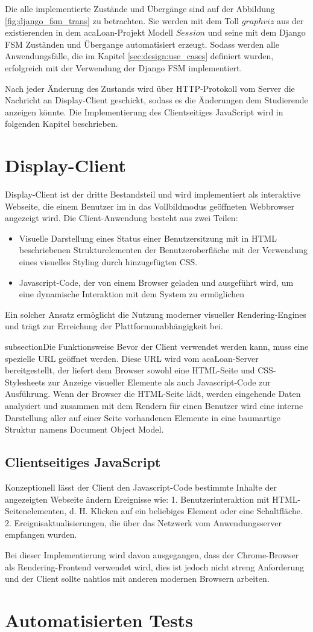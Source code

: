 Die alle implementierte Zustände und Übergänge sind auf der Abbildung \ref{fig:django_fsm_trans} zu betrachten. Sie werden mit dem Toll $graphviz$ aus der existierenden in dem acaLoan-Projekt Modell $Session$ und seine mit dem Django FSM Zuständen und Übergange automatisiert erzeugt. Sodass werden alle Anwendungsfälle, die im Kapitel \ref{sec:design:use_cases} definiert wurden, erfolgreich mit der Verwendung der Django FSM implementiert. 

Nach jeder Änderung des Zustands wird über HTTP-Protokoll vom Server die Nachricht an Display-Client geschickt, sodass es die Änderungen dem Studierende anzeigen könnte. Die Implementierung des Clientseitiges JavaScript wird in folgenden Kapitel beschrieben.  

\section{Display-Client}
\label{sec:display_client}
Display-Client ist der dritte Bestandsteil und wird implementiert als interaktive Webseite, die einem Benutzer im in das Vollbildmodus geöffneten Webbrowser angezeigt wird. Die Client-Anwendung besteht aus zwei Teilen: 
\begin{itemize}
	\item Visuelle Darstellung eines Status einer Benutzersitzung mit in HTML beschriebenen Strukturelementen der Benutzeroberfläche mit der Verwendung eines visuelles Styling durch hinzugefügten CSS.
	\item Javascript-Code, der von einem Browser geladen und ausgeführt wird, um eine dynamische Interaktion mit dem System zu ermöglichen
\end{itemize}
Ein solcher Ansatz ermöglicht die Nutzung moderner visueller Rendering-Engines und trägt zur Erreichung der Plattformunabhängigkeit bei. 


subsection{Die Funktionsweise}
\label{sec:display_client:funkt}
Bevor der Client verwendet werden kann, muss eine spezielle URL geöffnet werden. Diese URL wird vom acaLoan-Server bereitgestellt, der liefert dem Browser sowohl eine HTML-Seite und CSS-Stylesheets zur Anzeige visueller Elemente als auch Javascript-Code zur Ausführung. Wenn der Browser die HTML-Seite lädt, werden eingehende Daten analysiert und zusammen mit dem Rendern für einen Benutzer wird eine interne Darstellung aller auf einer Seite vorhandenen Elemente in eine baumartige Struktur namens Document Object Model.

\subsection{Clientseitiges JavaScript}
\label{sec:display_client:js}
Konzeptionell lässt der Client den Javascript-Code bestimmte Inhalte der angezeigten Webseite ändern
Ereignisse wie:
1. Benutzerinteraktion mit HTML-Seitenelementen, d. H. Klicken auf ein beliebiges Element oder eine Schaltfläche.
2. Ereignisaktualisierungen, die über das Netzwerk vom Anwendungsserver empfangen wurden.

Bei dieser Implementierung wird davon ausgegangen, dass der Chrome-Browser als Rendering-Frontend verwendet wird, dies ist jedoch nicht streng
Anforderung und der Client sollte nahtlos mit anderen modernen Browsern arbeiten.




\section{Automatisierten Tests}
\label{sec:testing}